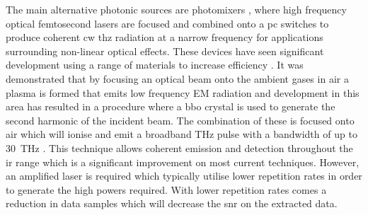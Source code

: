 The main alternative photonic sources are photomixers \DIFdelbegin \DIFdel{~}\DIFdelend \cite{McIntosh1995}, where high frequency optical femtosecond lasers are focused and combined onto a \acrshort{pc} switches to produce coherent \acrshort{cw} \acrshort{thz} radiation at a narrow frequency for applications surrounding non-linear optical effects. These devices have seen significant development using a range of materials to increase efficiency \DIFdelbegin \DIFdel{~}\DIFdelend \cite{AlMuhadar2022}.
It was demonstrated that by focusing an optical beam onto the ambient gases in air a plasma is formed that emits low frequency EM radiation \DIFdelbegin \DIFdel{~}\DIFdelend \cite{Hamster1993} and development in this area has resulted in a procedure where a \acrfull{bbo} crystal is used to generate the second harmonic of the incident beam. The combination of these is focused onto air which will ionise and emit a broadband THz pulse with a bandwidth of up to \SI{30}{THz} \DIFdelbegin \DIFdel{~}\DIFdelend \cite{Dai2011}. This technique allows coherent emission and detection throughout the \acrshort{ir} range which is a significant improvement on most current techniques. However, an amplified laser is required which typically utilise lower repetition rates in order to generate the high powers required. With lower repetition rates comes a reduction in data samples which will decrease the \acrshort{snr} on the extracted data.

